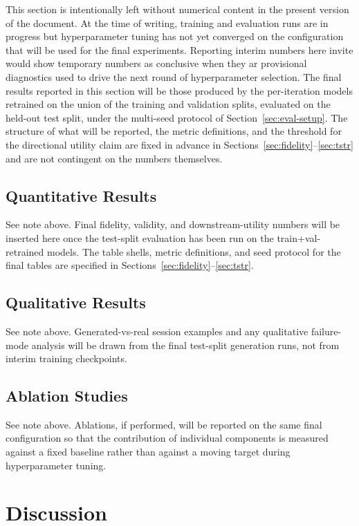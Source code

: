 \documentclass[sigconf,nonacm]{acmart}
\begin{document}
This section is intentionally left without numerical content in the
present version of the document. At the time of writing, training and
evaluation runs are in progress but hyperparameter tuning has not yet
converged on the configuration that will be used for the final
experiments. Reporting interim numbers here invite would show temporary numbers as conclusive when they ar provisional
diagnostics used to drive the next round of hyperparameter selection.
The final results reported in this section will be those
produced by the per-iteration models retrained on the union of the
training and validation splits, evaluated on the held-out test split,
under the multi-seed protocol of Section~\ref{sec:eval-setup}.
The structure of what will be reported, the
metric definitions, and the threshold for the directional utility
claim are fixed in advance in
Sections~\ref{sec:fidelity}--\ref{sec:tstr} and are not contingent on
the numbers themselves.

\subsection{Quantitative Results}
See note above. Final fidelity, validity, and downstream-utility
numbers will be inserted here once the test-split evaluation has been
run on the train+val-retrained models. The table shells, metric
definitions, and seed protocol for the final tables are specified in
Sections~\ref{sec:fidelity}--\ref{sec:tstr}.

\subsection{Qualitative Results}
See note above. Generated-vs-real session examples and any
qualitative failure-mode analysis will be drawn from the final
test-split generation runs, not from interim training checkpoints.

\subsection{Ablation Studies}
See note above. Ablations, if performed, will be reported on the
same final configuration so that the contribution of individual
components is measured against a fixed baseline rather than against
a moving target during hyperparameter tuning.

\section{Discussion}
\label{sec:discussion}
\end{document}
